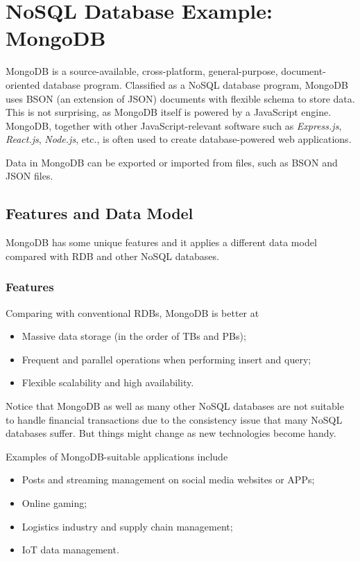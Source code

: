 \chapter{NoSQL Database Example: MongoDB}

MongoDB is a source-available, cross-platform, general-purpose, document-oriented database program. Classified as a NoSQL database program, MongoDB uses BSON (an extension of JSON) documents with flexible schema to store data. This is not surprising, as MongoDB itself is powered by a JavaScript engine. MongoDB, together with other JavaScript-relevant software such as \textit{Express.js}, \textit{React.js}, \textit{Node.js}, etc., is often used to create database-powered web applications.

Data in MongoDB can be exported or imported from files, such as BSON and JSON files.

\section{Features and Data Model}

MongoDB has some unique features and it applies a different data model compared with RDB and other NoSQL databases.

\subsection{Features}

Comparing with conventional RDBs, MongoDB is better at
\begin{itemize}
	\item Massive data storage (in the order of TBs and PBs);
	\item Frequent and parallel operations when performing insert and query;
	\item Flexible scalability and high availability.
\end{itemize}
Notice that MongoDB as well as many other NoSQL databases are not suitable to handle financial transactions due to the consistency issue that many NoSQL databases suffer. But things might change as new technologies become handy.

Examples of MongoDB-suitable applications include
\begin{itemize}
	\item Posts and streaming management on social media websites or APPs;
	\item Online gaming;
	\item Logistics industry and supply chain management;
	\item IoT data management.
\end{itemize}

